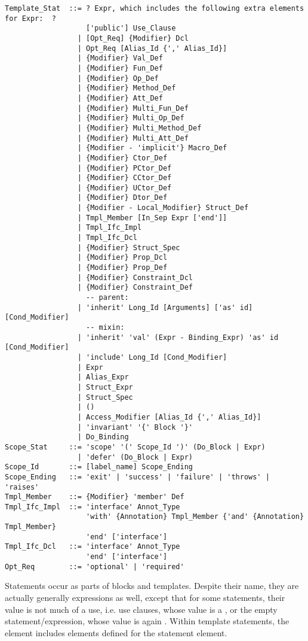 \grammar\begin{lstlisting}[deletekeywords={for}]
Template_Stat  ::= ? Expr, which includes the following extra elements for Expr:  ?
                   ['public'] Use_Clause
                 | [Opt_Req] {Modifier} Dcl
                 | Opt_Req [Alias_Id {',' Alias_Id}]
                 | {Modifier} Val_Def
                 | {Modifier} Fun_Def
                 | {Modifier} Op_Def
                 | {Modifier} Method_Def
                 | {Modifier} Att_Def
                 | {Modifier} Multi_Fun_Def
                 | {Modifier} Multi_Op_Def
                 | {Modifier} Multi_Method_Def
                 | {Modifier} Multi_Att_Def
                 | {Modifier - 'implicit'} Macro_Def
                 | {Modifier} Ctor_Def
                 | {Modifier} PCtor_Def
                 | {Modifier} CCtor_Def
                 | {Modifier} UCtor_Def
                 | {Modifier} Dtor_Def
                 | {Modifier - Local_Modifier} Struct_Def
                 | Tmpl_Member [In_Sep Expr ['end']]
                 | Tmpl_Ifc_Impl
                 | Tmpl_Ifc_Dcl
                 | {Modifier} Struct_Spec
                 | {Modifier} Prop_Dcl
                 | {Modifier} Prop_Def
                 | {Modifier} Constraint_Dcl
                 | {Modifier} Constraint_Def
                   -- parent:
                 | 'inherit' Long_Id [Arguments] ['as' id] [Cond_Modifier]
                   -- mixin:
                 | 'inherit' 'val' (Expr - Binding_Expr) 'as' id [Cond_Modifier]
                 | 'include' Long_Id [Cond_Modifier]
                 | Expr
                 | Alias_Expr
                 | Struct_Expr
                 | Struct_Spec
                 | ()
                 | Access_Modifier [Alias_Id {',' Alias_Id}]
                 | 'invariant' '{' Block '}'
                 | Do_Binding
Scope_Stat     ::= 'scope' '(' Scope_Id ')' (Do_Block | Expr)
                 | 'defer' (Do_Block | Expr)
Scope_Id       ::= [label_name] Scope_Ending
Scope_Ending   ::= 'exit' | 'success' | 'failure' | 'throws' | 'raises'
Tmpl_Member    ::= {Modifier} 'member' Def
Tmpl_Ifc_Impl  ::= 'interface' Annot_Type
                   'with' {Annotation} Tmpl_Member {'and' {Annotation} Tmpl_Member} 
                   'end' ['interface']
Tmpl_Ifc_Dcl   ::= 'interface' Annot_Type 
                   'end' ['interface']
Opt_Req        ::= 'optional' | 'required'
\end{lstlisting}

Statements occur as parts of blocks and templates. Despite their name, they are actually generally expressions as well, except that for some statements, their value is not much of a use, i.e. use clauses, whose value is a \code{()}, or the empty statement/expression, whose value is again \code{()}. Within template statements, the  element includes elements defined for the statement element. 







